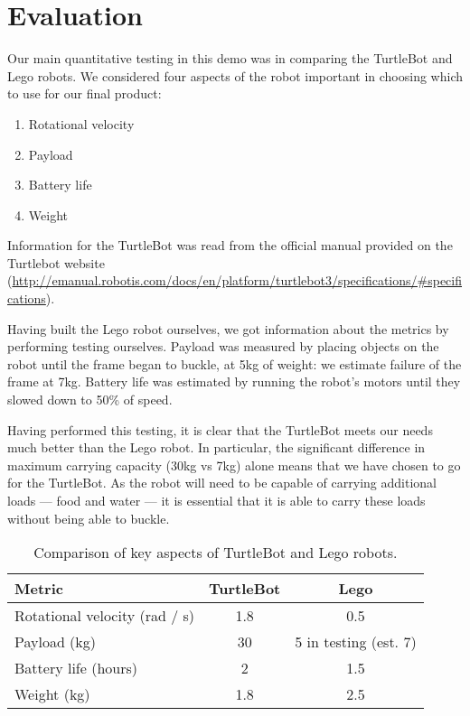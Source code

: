 \documentclass{article}
\begin{document}
\section{Evaluation}
Our main quantitative testing in this demo was in comparing the TurtleBot and Lego robots. We considered four aspects of the robot important in choosing which to use for our final product:
\begin{enumerate}
\item Rotational velocity
\item Payload
\item Battery life
\item Weight
\end{enumerate}

Information for the TurtleBot was read from the official manual provided on the Turtlebot website (\url{http://emanual.robotis.com/docs/en/platform/turtlebot3/specifications/\#specifications}).

Having built the Lego robot ourselves, we got information about the metrics by performing testing ourselves. Payload was measured by placing objects on the robot until the frame began to buckle, at 5kg of weight: we estimate failure of the frame at 7kg. Battery life was estimated by running the robot's motors until they slowed down to 50\% of speed. 

Having performed this testing, it is clear that the TurtleBot meets our needs much better than the Lego robot. In particular, the significant difference in maximum carrying capacity (30kg vs 7kg) alone means that we have chosen to go for the TurtleBot. As the robot will need to be capable of carrying additional loads --- food and water --- it is essential that it is able to carry these loads without being able to buckle.


\begin{table}[h]
\vskip 3mm
\begin{center}
\begin{small}
\begin{sc}
\begin{tabular}{lcc}
\hline
\abovespace\belowspace
Metric & TurtleBot & Lego \\
\hline
  Rotational velocity (rad / s) & 1.8 & 0.5 \\
  Payload (kg) & 30 & 5 in testing (est. 7) \\
  Battery life (hours) & 2 & 1.5 \\
  Weight (kg) & 1.8 & 2.5 
\end{tabular}
\end{sc}
\end{small}
\caption{Comparison of key aspects of TurtleBot and Lego robots.}
\label{tab:sample-table}
\end{center}
\vskip -3mm
\end{table}
\end{document}

